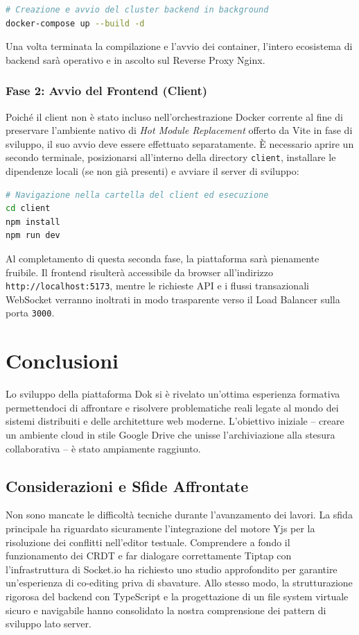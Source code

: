 \documentclass[11pt,a4paper]{report}
\begin{document}
\begin{lstlisting}[language=bash]
# Creazione e avvio del cluster backend in background
docker-compose up --build -d
\end{lstlisting}

Una volta terminata la compilazione e l'avvio dei container, l'intero ecosistema di backend sarà operativo e in ascolto sul Reverse Proxy Nginx.

\subsection{Fase 2: Avvio del Frontend (Client)}
Poiché il client non è stato incluso nell'orchestrazione Docker corrente al fine di preservare l'ambiente nativo di \textit{Hot Module Replacement} offerto da Vite in fase di sviluppo, il suo avvio deve essere effettuato separatamente. È necessario aprire un secondo terminale, posizionarsi all'interno della directory \texttt{client}, installare le dipendenze locali (se non già presenti) e avviare il server di sviluppo:

\begin{lstlisting}[language=bash]
# Navigazione nella cartella del client ed esecuzione
cd client
npm install
npm run dev
\end{lstlisting}

Al completamento di questa seconda fase, la piattaforma sarà pienamente fruibile. Il frontend risulterà accessibile da browser all'indirizzo \texttt{http://localhost:5173}, mentre le richieste API e i flussi transazionali WebSocket verranno inoltrati in modo trasparente verso il Load Balancer sulla porta \texttt{3000}.

\chapter{Conclusioni}

Lo sviluppo della piattaforma Dok si è rivelato un'ottima esperienza formativa permettendoci di affrontare e risolvere problematiche reali legate al mondo dei sistemi distribuiti e delle architetture web moderne. L'obiettivo iniziale – creare un ambiente cloud in stile Google Drive che unisse l'archiviazione alla stesura collaborativa – è stato ampiamente raggiunto.

\section{Considerazioni e Sfide Affrontate}
Non sono mancate le difficoltà tecniche durante l'avanzamento dei lavori. La sfida principale ha riguardato sicuramente l'integrazione del motore Yjs per la risoluzione dei conflitti nell'editor testuale. Comprendere a fondo il funzionamento dei CRDT e far dialogare correttamente Tiptap con l'infrastruttura di Socket.io ha richiesto uno studio approfondito per garantire un'esperienza di co-editing priva di sbavature.
Allo stesso modo, la strutturazione rigorosa del backend con TypeScript e la progettazione di un file system virtuale sicuro e navigabile hanno consolidato la nostra comprensione dei pattern di sviluppo lato server.
\end{document}
